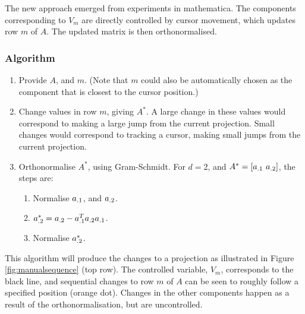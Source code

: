 \documentclass[]{interact}
\theoremstyle{plain}%
\theoremstyle{definition}
\theoremstyle{remark}
\providecommand{\tightlist}{%
  \setlength{\itemsep}{0pt}\setlength{\parskip}{0pt}}
\def\tightlist{}
\begin{document}
The new approach emerged from experiments in mathematica. The components
corresponding to \(V_m\) are directly controlled by cursor movement,
which updates row \(m\) of \(A\). The updated matrix is then
orthonormalised.

\hypertarget{algorithm}{%
\subsubsection{Algorithm}\label{algorithm}}

\begin{enumerate}
\def\labelenumi{\arabic{enumi}.}
\item
  Provide \(A\), and \(m\). (Note that \(m\) could also be automatically
  chosen as the component that is closest to the cursor position.)
\item
  Change values in row \(m\), giving \(A^*\). A large change in these
  values would correspond to making a large jump from the current
  projection. Small changes would correspond to tracking a cursor,
  making small jumps from the current projection.
\item
  Orthonormalise \(A^*\), using Gram-Schmidt. For \(d=2\), and
  \(A^* = \left[ {\boldmath a}_{.1}~{\boldmath a}_{.2}\right]\), the
  steps are:

  \begin{enumerate}
  \def\labelenumii{\roman{enumii}.}
  \tightlist
  \item
    Normalise \({\boldmath a}_{.1}\), and \({\boldmath a}_{.2}\).
  \item
    \({\boldmath a}^*_{.2} = {\boldmath a}_{.2} - {\boldmath a}_{.1}^T{\boldmath a}_{.2}{\boldmath a}_{.1}\).
  \item
    Normalise \({\boldmath a}^*_{.2}\).
  \end{enumerate}
\end{enumerate}

This algorithm will produce the changes to a projection as illustrated
in Figure \ref{fig:manualsequence} (top row). The controlled variable,
\(V_m\), corresponds to the black line, and sequential changes to row
\(m\) of \(A\) can be seen to roughly follow a specified position
(orange dot). Changes in the other components happen as a result of the
orthonormalisation, but are uncontrolled.
\end{document}
